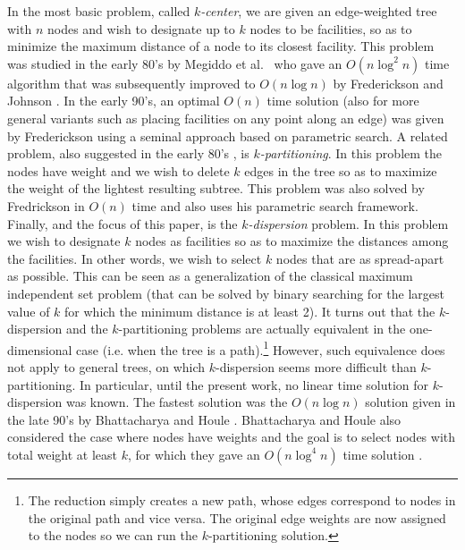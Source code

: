 \documentclass[11pt,a4paper]{article}
\newcommand{\Oh}{{O}}
\theoremstyle{definition}
\theoremstyle{remark}
\begin{document}
In the most basic problem, called \emph{$k$-center}, we are given an edge-weighted tree with $n$ nodes and wish to designate up to $k$ nodes to be facilities, so as to minimize the maximum distance of a node to its closest facility. This problem was studied in the early 80's by Megiddo et al.~\cite{Megiddo1981} who gave an $\Oh(n\log^2n)$ time algorithm that was subsequently improved to $\Oh(n\log n)$ by Frederickson and Johnson \cite{Frederickson1983}. In the early 90's, an optimal $\Oh(n)$ time solution (also for more general variants such as placing facilities on any point along an edge) was given by Frederickson \cite{Frederickson1991a} %
using a seminal approach based on parametric search. 
%
A related problem, also suggested in the early 80's  \cite{Becker1982,Perl1981}, is \emph{$k$-partitioning}. In this problem the nodes have weight and we wish to delete $k$ edges in the tree so as to maximize the weight of the lightest resulting subtree. This problem was also solved by Fredrickson in $\Oh(n)$ time \cite{Frederickson1991} and also uses his parametric search framework. 
%
Finally, and the focus of this paper, is the  {\em $k$-dispersion} problem. In this problem we wish to designate $k$ nodes as facilities so as to maximize the distances among the facilities.  In other words, we wish to select $k$ nodes that are as spread-apart as possible. This can be seen as a generalization of the classical maximum independent set problem (that can be solved by binary searching for the largest value of $k$ for which the minimum distance is at least 2).  
%
It turns out that the $k$-dispersion and the $k$-partitioning problems are actually equivalent in the one-dimensional case (i.e. when the tree is a path).\footnote{The reduction simply creates a new path, whose edges correspond to nodes in the original path and vice versa. The original edge weights are now assigned to the nodes so we can run the $k$-partitioning solution.} However, such equivalence does not apply to general trees, on which $k$-dispersion seems more difficult than $k$-partitioning. In particular, until the present work, no linear time solution for $k$-dispersion was known. The fastest solution was the $O(n \log n)$ solution given in the late 90's by Bhattacharya and Houle \cite{Bhattacharya1991}. Bhattacharya and Houle also considered the case where nodes have weights and the goal is to select nodes with total weight at least $k$, for which they gave an $\Oh(n\log^4 n)$ time solution \cite{Bhattacharya1999}.
\end{document}
